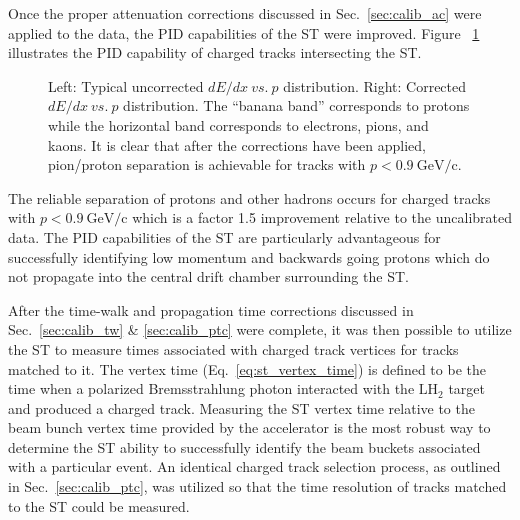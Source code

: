 Once the proper attenuation corrections discussed in Sec.~\ref{sec:calib_ac} were applied to the data, the PID capabilities of the ST were improved.  Figure ~\ref{fig:dEdx_vs_p} illustrates the PID capability of charged tracks intersecting the ST.  
	\begin{figure}[!htb]
		\centering
		\hfill
		\caption{Left: Typical uncorrected $dE/dx\ vs.\ p$ distribution. Right: Corrected $dE/dx\ vs.\ p$ distribution.  The ``banana band'' corresponds to protons while the horizontal band corresponds to electrons, pions, and kaons. It is clear that after the corrections have been applied, pion/proton separation is achievable for tracks with $p < 0.9\ \mathrm{GeV/c}$.}
		\label{fig:dEdx_vs_p}
	\end{figure}  

The reliable separation of protons and other hadrons occurs for charged tracks with $p < 0.9\ \mathrm{GeV/c}$ which is a factor 1.5 improvement relative to the uncalibrated data.  The PID capabilities of the ST are particularly advantageous for successfully identifying low momentum and backwards going protons which do not propagate into the central drift chamber surrounding the ST.

After the time-walk and propagation time corrections discussed in Sec.~\ref{sec:calib_tw} \& \ref{sec:calib_ptc} were complete, it was then possible to utilize the ST to measure times associated with charged track vertices for tracks matched to it.  The vertex time (Eq.~\ref{eq:st_vertex_time})  is defined to be the time when a polarized Bremsstrahlung photon interacted with the $\mathrm{LH_{2}}$ target and produced a charged track.  Measuring the ST vertex time relative to the beam bunch vertex time provided by the accelerator is the most robust way to determine the ST ability to successfully identify the beam buckets associated with a particular event.  An identical charged track selection process, as outlined in Sec.~\ref{sec:calib_ptc}, was utilized so that the time resolution of tracks matched to the ST could be measured.  


